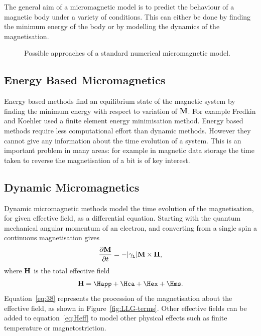 The general aim of a micromagnetic model is to predict the behaviour of a magnetic body under a variety of conditions. This can either be done by finding the minimum energy of the body or by modelling the dynamics of the magnetisation.

\begin{figure}[ht!]
  \centering
  \caption{Possible approaches of a standard numerical micromagnetic model.}
  \label{fig:types-micromag-model}
\end{figure}


\subsection{Energy Based Micromagnetics}
\label{sec:energy-based-micr}

Energy based methods find an equilibrium state of the magnetic system by finding the minimum energy with respect to variation of $\mathbf{M}$. For example Fredkin and Koehler used a finite element energy minimisation method.\cite{Koehler1992} Energy based methods require less computational effort than dynamic methods. However they cannot give any information about the time evolution of a system.\cite{Fidler2000} This is an important problem in many areas: for example in magnetic data storage the time taken to reverse the magnetisation of a bit is of key interest.


\subsection{Dynamic Micromagnetics}
\label{sec:land-lifsch-gilb}

Dynamic micromagnetic methods model the time evolution of the magnetisation, for given effective field, as a differential equation. Starting with the quantum mechanical angular momentum of an electron, and converting from a single spin a continuous magnetisation gives\cite{Kronmuller2003}
\begin{equation}
  \label{eq:38}
  \frac{\partial \mathbf{M}}{\partial t} = - {\left|{\gamma_{\text{\tiny{L}}}} \right|} \mathbf{M} \times \mathbf{H},
\end{equation}
where $\mathbf{H}$ is the total effective field
\begin{equation}
  \Hv = \Happ + \Hca + \Hex + \Hms.
  \label{eq:Heff}
\end{equation}
Equation~\eqref{eq:38} represents the procession of the magnetisation about the effective field, as shown in Figure~\ref{fig:LLG-terms}. Other effective fields can be added to equation~\eqref{eq:Heff} to model other physical effects such as finite temperature or magnetostriction.

